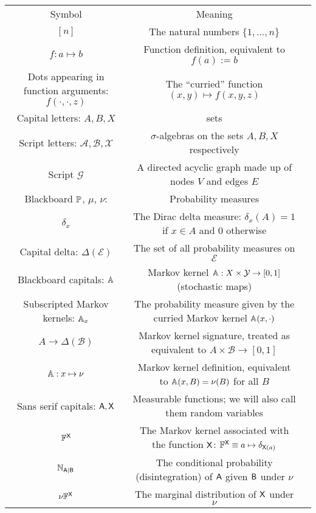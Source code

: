 \begin{center}
\begin{tabular}{ |c|c|c| } 
 \hline
 Symbol & Meaning \\ 
 $[n]$& The natural numbers $\{1,...,n\}$ \\ 
 $f:a\mapsto b$ & Function definition, equivalent to $f(a):=b$\\
 Dots appearing in function arguments: $f(\cdot,\cdot,z)$ & The ``curried'' function $(x, y )\mapsto f(x,y,z)$\\
 Capital letters: $A,B, X$ & sets \\ 
 Script letters: $\mathcal{A},\mathcal{B},\mathcal{X}$ & $\sigma$-algebras on the sets $A, B, X$ respectively\\
 Script $\mathcal{G}$ & A directed acyclic graph made up of nodes $V$ and edges $E$\\
 Blackboard $\mathbb{P}$, $\mu$, $\nu$: & Probability measures\\
 $\delta_x$ & The Dirac delta measure: $\delta_x(A) = 1$ if $x\in A$ and $0$ otherwise\\
 Capital delta: $\Delta(\mathcal{E})$ & The set of all probability measures on $\mathcal{E}$\\
 Blackboard capitals: $\mathbb{A}$ & Markov kernel $\mathbb{A}:X\times\mathcal{Y}\to [0,1]$ (stochastic maps)\\
 Subscripted Markov kernels: $\mathbb{A}_x$ & The probability measure given by the curried Markov kernel $\mathbb{A}(x,\cdot)$\\
 $A\to\Delta(\mathcal{B})$ & Markov kernel signature, treated as equivalent to $A\times \mathcal{B}\to [0,1]$\\
 $\mathbb{A}:x\mapsto \nu$ & Markov kernel definition, equivalent to $\mathbb{A}(x,B) = \nu(B)$ for all $B$\\
 Sans serif capitals: $\mathsf{A},\mathsf{X}$ & Measurable functions; we will also call them random variables\\
 $\mathbb{F}^{\mathsf{X}}$ & The Markov kernel associated with the function $\mathsf{X}$: $\mathbb{F}^{\mathsf{X}} \equiv a\mapsto \delta_{\mathsf{X}(a)}$\\
 $\mathbb{N}_{\mathsf{A}|\mathsf{B}}$ & The conditional probability (disintegration) of $\mathsf{A}$ given $\mathsf{B}$ under $\nu$\\
 $\nu \mathbb{F}^{\mathsf{X}}$ & The marginal distribution of $\mathsf{X}$ under $\nu$\\
 \hline
\end{tabular}
\end{center}

